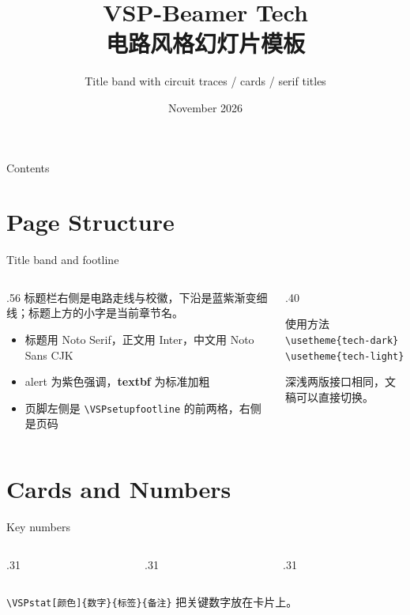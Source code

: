 \documentclass[aspectratio=169,10pt]{beamer}
\title[VSP-Beamer Tech]{VSP-Beamer Tech\\电路风格幻灯片模板}
\subtitle{Title band with circuit traces / cards / serif titles}
\date{November 2026}
\begin{document}
\VSPtitleframe

\begin{frame}{Contents}
  \tableofcontents
\end{frame}

\section{Page Structure}

\begin{frame}[t]{Title band and footline}
\begin{columns}[T,onlytextwidth]
  \begin{column}{.56\textwidth}
    标题栏右侧是电路走线与校徽，下沿是蓝紫渐变细线；标题上方的小字是当前章节名。
    \begin{itemize}
      \item 标题用 Noto Serif，正文用 Inter，中文用 Noto Sans CJK
      \item \alert{alert} 为紫色强调，\textbf{textbf} 为标准加粗
      \item 页脚左侧是 \texttt{\textbackslash VSPsetupfootline} 的前两格，右侧是页码
    \end{itemize}
  \end{column}
  \begin{column}{.40\textwidth}
    \begin{vspquote}{使用方法}
      \texttt{\textbackslash usetheme\{tech-dark\}}\\
      \texttt{\textbackslash usetheme\{tech-light\}}

      深浅两版接口相同，文稿可以直接切换。
    \end{vspquote}
  \end{column}
\end{columns}
\end{frame}

\section{Cards and Numbers}

\begin{frame}[t]{Key numbers}
\begin{columns}[T,onlytextwidth]
  \begin{column}{.31\textwidth}\end{column}
  \begin{column}{.31\textwidth}\end{column}
  \begin{column}{.31\textwidth}\end{column}
\end{columns}

\vspace{6pt}
\texttt{\textbackslash VSPstat[颜色]\{数字\}\{标签\}\{备注\}} 把关键数字放在卡片上。
\end{frame}
\end{document}
